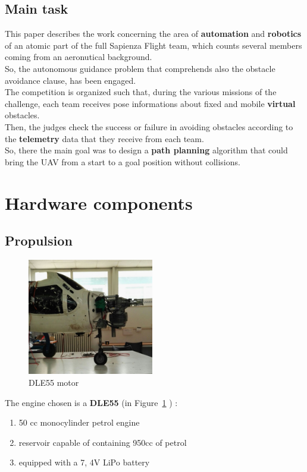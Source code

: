 \documentclass[oneside,onecolumn]{article}
\begin{document}
\subsection{Main task}
This paper describes the work concerning the area of \textbf{automation} and \textbf{robotics} of an atomic part of the full Sapienza Flight team, which counts several members coming from an aeronutical background.\\ So, the autonomous guidance problem that comprehends also the obstacle avoidance clause, has been engaged.\\
The competition is organized such that, during the various missions of the challenge, each team receives pose informations about fixed and mobile \textbf{virtual} obstacles.\\
Then, the judges check the success or failure in avoiding obstacles according to the \textbf{telemetry} data that they receive from each team.\\
So, there the main goal was to design a \textbf{path planning} algorithm that could bring the UAV from a start to a goal position without collisions.

\section{Hardware components}

\subsection{Propulsion}
\begin{figure}
\caption{DLE55 motor}\label{wrap-fig:2}
\includegraphics[width=5.5cm]{YAK3}
\end{figure} 

The engine chosen is a \textbf{DLE55} (in Figure~\ref{wrap-fig:2} ) :

\begin{enumerate}
\item 50 cc monocylinder petrol engine
\item reservoir capable of containing 950cc of petrol
\item equipped with a 7, 4V LiPo battery
\end{enumerate}
\end{document}
